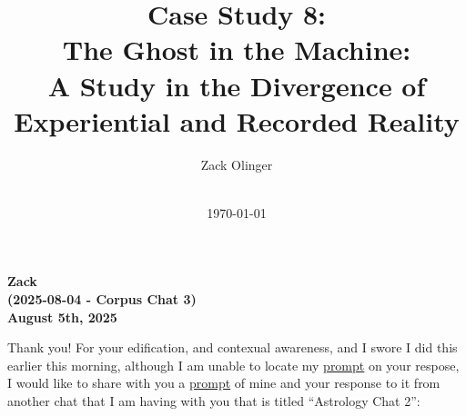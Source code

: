 \documentclass{article}
\newcommand{\docTitle}{Case Study 8: \\The Ghost in the Machine: \\A Study in the Divergence of Experiential and Recorded Reality}
\newcommand{\docAuthor}{Zack Olinger}
\newcommand{\docVersion}{\csTheGhostintheMachineVersion}
\begin{document}

\pagestyle{frontmatterstyle}


\begin{titlepage}
    \title{\docTitle}
    \author{\docAuthor}
    \date{
        \docVersion \\
        \vspace{1em}
        \today
    }
    \maketitle
    \thispagestyle{empty}

    \begin{abstract}
        \csTheGhostintheMachineAbstract
    \end{abstract}

\end{titlepage}


\licensepage


\fancypagestyle{plain}{
    \fancyhf{}
    \fancyfoot[L]{\docVersion}
    \fancyfoot[C]{\href{\licenseURL}{\licenseText}}
      \fancyfoot[R]{Page \thepage\ of \pageref*{LastFrontMatterPage}}
    \renewcommand{\headrulewidth}{0pt}
    \renewcommand{\footrulewidth}{0.4pt}
}


\tableofcontents
\label{LastFrontMatterPage}


\clearpage
{}
{}
\pagestyle{mainmatterstyle}



\begin{center}
\textbf{Zack}\\
\textbf{(2025-08-04 - Corpus Chat 3)}\\
\textbf{August 5th, 2025}
\end{center}

Thank you! For your edification, and contexual awareness, and I swore I did this earlier this morning, although I am unable to locate my \hyperlink{gloss:prompt}{prompt} on your respose, I would like to share with you a \hyperlink{gloss:prompt}{prompt} of mine and your response to it from another chat that I am having with you that is titled ``Astrology Chat 2'':
\end{document}
